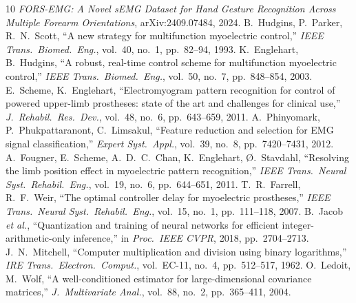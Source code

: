 \documentclass[11pt,a4paper]{article}
\begin{document}
\begin{thebibliography}{10}\small
{} \emph{FORS-EMG: A Novel sEMG Dataset for Hand Gesture Recognition Across Multiple Forearm
Orientations}, arXiv:2409.07484, 2024.
 B.~Hudgins, P.~Parker, R.~N.~Scott, ``A new strategy for multifunction myoelectric
control,'' \emph{IEEE Trans.\ Biomed.\ Eng.}, vol.~40, no.~1, pp.~82--94, 1993.
 K.~Englehart, B.~Hudgins, ``A robust, real-time control scheme for multifunction
myoelectric control,'' \emph{IEEE Trans.\ Biomed.\ Eng.}, vol.~50, no.~7, pp.~848--854, 2003.
 E.~Scheme, K.~Englehart, ``Electromyogram pattern recognition for control of powered
upper-limb prostheses: state of the art and challenges for clinical use,'' \emph{J.\ Rehabil.\ Res.\ Dev.},
vol.~48, no.~6, pp.~643--659, 2011.
 A.~Phinyomark, P.~Phukpattaranont, C.~Limsakul, ``Feature reduction and selection for
EMG signal classification,'' \emph{Expert Syst.\ Appl.}, vol.~39, no.~8, pp.~7420--7431, 2012.
 A.~Fougner, E.~Scheme, A.~D.~C.~Chan, K.~Englehart, \O.~Stavdahl, ``Resolving the limb
position effect in myoelectric pattern recognition,'' \emph{IEEE Trans.\ Neural Syst.\ Rehabil.\ Eng.}, vol.~19,
no.~6, pp.~644--651, 2011.
 T.~R.~Farrell, R.~F.~Weir, ``The optimal controller delay for myoelectric prostheses,''
\emph{IEEE Trans.\ Neural Syst.\ Rehabil.\ Eng.}, vol.~15, no.~1, pp.~111--118, 2007.
 B.~Jacob \emph{et al.}, ``Quantization and training of neural networks for efficient
integer-arithmetic-only inference,'' in \emph{Proc.\ IEEE CVPR}, 2018, pp.~2704--2713.
 J.~N.~Mitchell, ``Computer multiplication and division using binary logarithms,''
\emph{IRE Trans.\ Electron.\ Comput.}, vol.~EC-11, no.~4, pp.~512--517, 1962.
 O.~Ledoit, M.~Wolf, ``A well-conditioned estimator for large-dimensional covariance
matrices,'' \emph{J.\ Multivariate Anal.}, vol.~88, no.~2, pp.~365--411, 2004.
\end{thebibliography}
\end{document}
